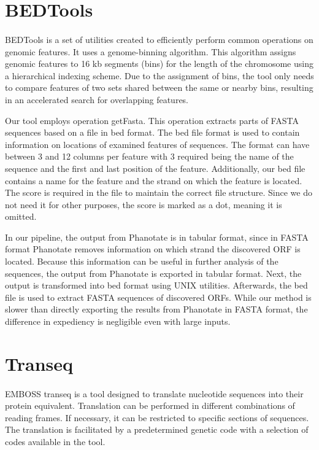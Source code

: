 \section{BEDTools}
\paragraph*{}
BEDTools\cite{quinlan2010bedtools} is a set of utilities created to efficiently perform common operations on genomic features. It uses a genome-binning algorithm. This algorithm assigns genomic features to 16 kb segments (bins) for the length of the chromosome using a hierarchical indexing scheme. Due to the assignment of bins, the tool only needs to compare features of two sets shared between the same or nearby bins, resulting in an accelerated search for overlapping features.

Our tool employs operation getFasta. This operation extracts parts of FASTA sequences based on a file in bed format. The bed file format is used to contain information on locations of examined features of sequences. The format can have between 3 and 12 columns per feature with 3 required being the name of the sequence and the first and last position of the feature. Additionally, our bed file contains a name for the feature and the strand on which the feature is located. The score is required in the file to maintain the correct file structure. Since we do not need it for other purposes, the score is marked as a dot, meaning it is omitted.

In our pipeline, the output from Phanotate is in tabular format, since in FASTA format Phanotate removes information on which strand the discovered ORF is located. Because this information can be useful in further analysis of the sequences, the output from Phanotate is exported in tabular format. Next, the output is transformed into bed format using UNIX utilities. Afterwards, the bed file is used to extract FASTA sequences of discovered ORFs. While our method is slower than directly exporting the results from Phanotate in FASTA format, the difference in expediency is negligible even with large inputs.

\section{Transeq}
\paragraph*{}
EMBOSS transeq\cite{madeira2022search} is a tool designed to translate nucleotide sequences into their protein equivalent. Translation can be performed in different combinations of reading frames. If necessary, it can be restricted to specific sections of sequences. The translation is facilitated by a predetermined genetic code with a selection of codes available in the tool.

